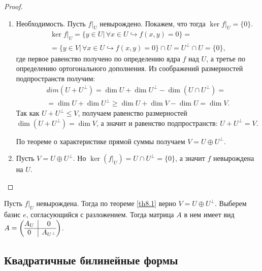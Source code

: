 \begin{proof}~
    \begin{enumerate}
        \item Необходимость. Пусть $f \vert_{U}$ невырождено. Покажем, что тогда 
        $\ker f \vert_{U} = \{0\}$.
        \begin{multline*}
            \ker f \vert_{U} = \{y \in U \vert \, \forall x \in U \hookrightarrow f(x, y) = 0\} = \\
            = \{y \in V \vert \, \forall x \in U \hookrightarrow f(x, y) = 0\} \cap U 
            = U^{\perp} \cap U = \{0\},
        \end{multline*}
        где первое равенство получено по определению ядра $f$ над $U$, а третье по определению 
        ортогонального дополнения. Из соображений размерностей подпространств получим:
        \begin{multline*}
            dim (U + U^{\perp}) = \dim U + \dim U^{\perp} - \dim (U \cap U^{\perp}) = \\ =
            \dim U + \dim U^{\perp} \geq \dim U + \dim V - \dim U = \dim V.
        \end{multline*} 
        Так как $U + U^{\perp} \leq V$, получаем равенство размерностей $\dim (U + U^{\perp}) = \dim V$, 
        а значит и равенство подпространств: $U + U^{\perp} = V$. 
        
        По теореме о характеристике прямой суммы получаем $V = U \oplus U^{\perp}$.

        \item Пусть $V = U \oplus U^{\perp}$. Но $\ker (f \vert_{U}) = U \cap U^{\perp} = \{0\}$, 
        а значит $f$ невырождена на $U$.
    \end{enumerate}
\end{proof}

\begin{note}
    Пусть $f \vert_{U}$ невырождена. Тогда по теореме \ref{th8.1} верно $V = U \oplus U^{\perp}$.
    Выберем базис $e$, согласующийся с разложением. Тогда матрица $A$ в нем имеет вид 
    $A = \left(\begin{array}{@{}c|c@{}}
            A_{U} & 0\\
            \hline
            0           & A_{U^{\perp}}
        \end{array}\right)$.
\end{note}

\subsection{Квадратичные билинейные формы}

